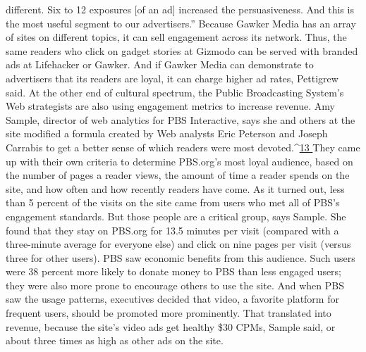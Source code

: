 different. Six to 12 exposures [of an ad] increased the persuasiveness. And this is
the most useful segment to our advertisers.''
Because Gawker Media has an array of sites on different topics, it can sell engagement
across its network. Thus, the same readers who click on gadget stories
at Gizmodo can be served with branded ads at Lifehacker or Gawker. And if
Gawker Media can demonstrate to advertisers that its readers are loyal, it can
charge higher ad rates, Pettigrew said.
At the other end of cultural spectrum, the Public Broadcasting System’s Web
strategists are also using engagement metrics to increase revenue.
Amy Sample, director of web analytics for PBS Interactive, says she and others
at the site modified a formula created by Web analysts Eric Peterson and Joseph
Carrabis to get a better sense of which readers were most devoted.^{\href{#endnotes-ch2}{13 }}They came
up with their own criteria to determine PBS.org’s most loyal audience, based on
the number of pages a reader views, the amount of time a reader spends on the
site, and how often and how recently readers have come.
As it turned out, less than 5 percent of the visits on the site came from users
who met all of PBS’s engagement standards. But those people are a critical
group, says Sample. She found that they stay on PBS.org for 13.5 minutes per
visit (compared with a three-minute average for everyone else) and click on nine
pages per visit (versus three for other users). PBS saw economic benefits from
this audience. Such users were 38 percent more likely to donate money to PBS
than less engaged users; they were also more prone to encourage others to use
the site. And when PBS saw the usage patterns, executives decided that video,
a favorite platform for frequent users, should be promoted more prominently.
That translated into revenue, because the site’s video ads get healthy \$30 CPMs,
Sample said, or about three times as high as other ads on the site.

